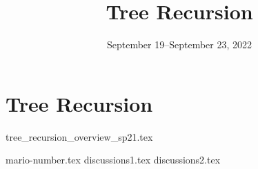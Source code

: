 \documentclass{exam}
\title{Tree Recursion}
\date{September 19--September 23, 2022}
\begin{document}
\maketitle

\section{Tree Recursion}
{tree_recursion_overview_sp21.tex}

\begin{questions}
{mario-number.tex}
\pagebreak
{discussions1.tex}
\pagebreak
{discussions2.tex}

\end{questions}
\end{document}

